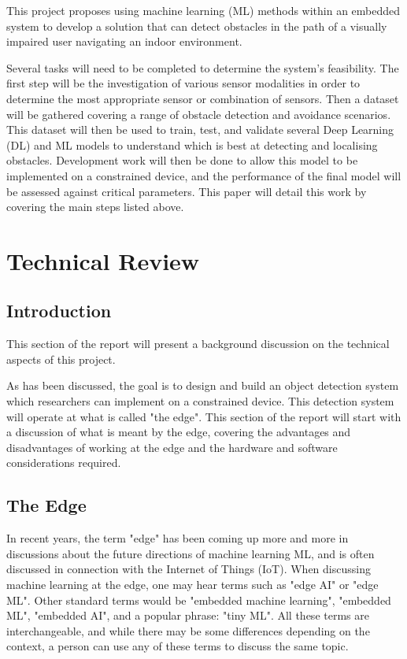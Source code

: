\documentclass[conference]{IEEEtran}
\begin{document}
This project proposes using machine learning (ML) methods within an embedded system to develop a solution that can detect obstacles in the path of a visually impaired user navigating an indoor environment. 
 
Several tasks will need to be completed to determine the system's feasibility. The first step will be the investigation of various sensor modalities in order to determine the most appropriate sensor or combination of sensors. Then a dataset will be gathered covering a range of obstacle detection and avoidance scenarios. This dataset will then be used to train, test, and validate several Deep Learning (DL) and ML models to understand which is best at detecting and localising obstacles. Development work will then be done to allow this model to be implemented on a constrained device, and the performance of the final model will be assessed against critical parameters.
This paper will detail this work by covering the main steps listed above. 

\section{Technical Review}
\subsection{Introduction}
This section of the report will present a background discussion on the technical aspects of this project. 

As has been discussed, the goal is to design and build an object detection system which researchers can implement on a constrained device. This detection system will operate at what is called "the edge". This section of the report will start with a discussion of what is meant by the edge, covering the advantages and disadvantages of working at the edge and the hardware and software considerations required. 

\subsection{The Edge}
In recent years, the term "edge" has been coming up more and more in discussions about the future directions of machine learning ML, and is often discussed in connection with the Internet of Things (IoT). When discussing machine learning at the edge, one may hear terms such as "edge AI" or "edge ML". Other standard terms would be "embedded machine learning", "embedded ML", "embedded AI", and a popular phrase: "tiny ML". All these terms are interchangeable, and while there may be some differences depending on the context, a person can use any of these terms to discuss the same topic.
\end{document}
